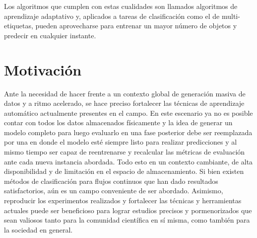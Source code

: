 Los algoritmos que cumplen con estas cualidades son llamados algoritmos de
aprendizaje adaptativo y, aplicados a tareas de clasificación como el de
multi-etiquetas, pueden aprovecharse para entrenar un mayor número de objetos y
predecir en cualquier instante.


\section{Motivación}

Ante la necesidad de hacer frente a un contexto global de generación masiva de
datos y a ritmo acelerado, se hace preciso fortalecer las técnicas de
aprendizaje automático actualmente presentes en el campo. En este escenario ya
no es posible contar con todos los datos almacenados físicamente y la idea de
generar un modelo completo para luego evaluarlo en una fase posterior debe ser
reemplazada por una en donde el modelo esté siempre listo para realizar
predicciones y al mismo tiempo ser capaz de reentrenarse y recalcular las
métricas de evaluación ante cada nueva instancia abordada. Todo esto en un
contexto cambiante, de alta disponibilidad y de limitación en el espacio de
almacenamiento. Si bien existen métodos de clasificación para flujos continuos
que han dado resultados satisfactorios, aún es un campo conveniente de ser
abordado. Asimismo, reproducir los experimentos realizados y fortalecer las
técnicas y herramientas actuales puede ser beneficioso para lograr estudios
precisos y pormenorizados que sean valiosos tanto para la comunidad científica
en sí misma, como también para la sociedad en general.

